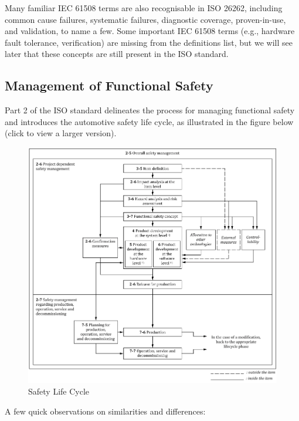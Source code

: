 \documentclass[./dissertation.tex]{subfiles}
\begin{document}
Many familiar IEC 61508 terms are also recognisable in ISO 26262, including common cause failures, systematic failures, diagnostic coverage, proven-in-use, and validation, to name a few. Some important IEC 61508 terms (e.g., hardware fault tolerance, verification) are missing from the definitions list, but we will see later that these concepts are still present in the ISO standard.


\subsection{Management of Functional Safety}
Part 2 of the ISO standard delineates the process for managing functional safety and introduces the automotive safety life cycle, as illustrated in the figure below (click to view a larger version).

\begin{figure}[h]
\centering
\includegraphics[scale=0.5]{subfiles/imgs/SafetyLifecycleFigure.png}
\caption{Safety Life Cycle}
\label{fig:safety_lifecycle}
\end{figure}


A few quick observations on similarities and differences:
\end{document}
